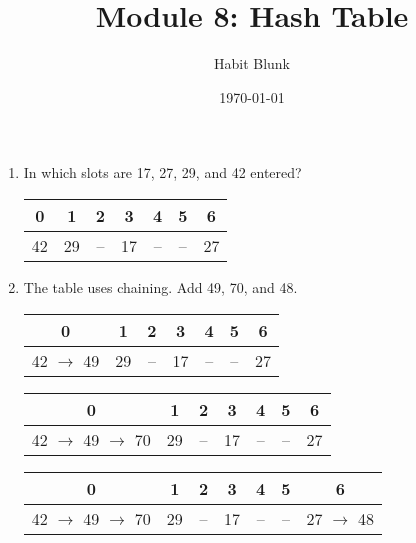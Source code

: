 \documentclass[fleqn]{article}
\title{Module 8: Hash Table}
\author{Habit Blunk}
\date{\today}
\begin{document}
\maketitle

\begin{enumerate}
  \item In which slots are 17, 27, 29, and 42 entered?

  \begin{tabular}{|c|c|c|c|c|c|c|}
    \hline
    0 & 1 & 2 & 3 & 4 & 5 & 6 \\
    \hline
    42 & 29 & -- & 17 & -- & -- & 27 \\
    \hline
  \end{tabular}

  \item The table uses chaining. Add 49, 70, and 48.

  \begin{tabular}{|c|c|c|c|c|c|c|}
    \hline
    0 & 1 & 2 & 3 & 4 & 5 & 6 \\
    \hline
    42 $\rightarrow$ 49 & 29 & -- & 17 & -- & -- & 27 \\
    \hline
  \end{tabular}

  \begin{tabular}{|c|c|c|c|c|c|c|}
    \hline
    0 & 1 & 2 & 3 & 4 & 5 & 6 \\
    \hline
    42 $\rightarrow$ 49 $\rightarrow$ 70 & 29 & -- & 17 & -- & -- & 27 \\
    \hline
  \end{tabular}

  \begin{tabular}{|c|c|c|c|c|c|c|}
    \hline
    0 & 1 & 2 & 3 & 4 & 5 & 6 \\
    \hline
    42 $\rightarrow$ 49 $\rightarrow$ 70 & 29 & -- & 17 & -- & -- & 27 $\rightarrow$ 48 \\
    \hline
  \end{tabular}

\end{enumerate}
\end{document}
